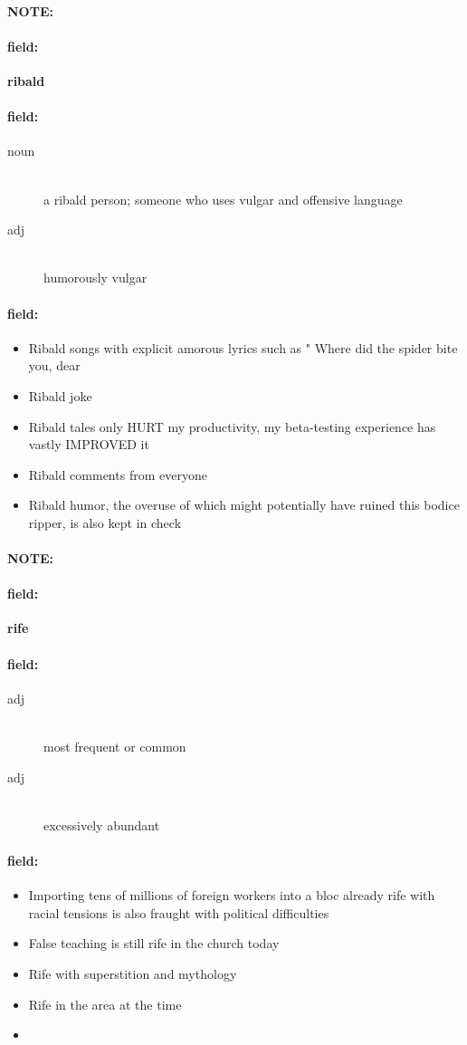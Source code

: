 \documentclass[12pt]{article}
\newenvironment{note}{\paragraph{NOTE:}}{}
\newenvironment{field}{\paragraph{field:}}{}
\begin{document}
\begin{note}
\begin{field}
\textbf{\large ribald}
\end{field}


\begin{field}
\begin{description}
\item[noun] \hfill \\ 
a ribald person; someone who uses vulgar and offensive language

\item[adj] \hfill \\ 
humorously vulgar

\end{description}
\end{field}

\begin{field}
\begin{itemize}
\item Ribald songs with explicit amorous lyrics such as " Where did the spider bite you, dear
\item Ribald joke
\item Ribald tales only HURT my productivity, my beta-testing experience has vastly IMPROVED it
\item Ribald comments from everyone
\item Ribald humor, the overuse of which might potentially have ruined this bodice ripper, is also kept in check
\end{itemize}
\end{field}
\end{note}
\begin{note}
\begin{field}
\textbf{\large rife}
\end{field}


\begin{field}
\begin{description}
\item[adj] \hfill \\ 
most frequent or common

\item[adj] \hfill \\ 
excessively abundant

\end{description}
\end{field}

\begin{field}
\begin{itemize}
\item Importing tens of millions of foreign workers into a bloc already rife with racial tensions is also fraught with political difficulties
\item False teaching is still rife in the church today
\item Rife with superstition and mythology
\item Rife in the area at the time
\item  
\end{itemize}
\end{field}
\end{note}
\end{document}
